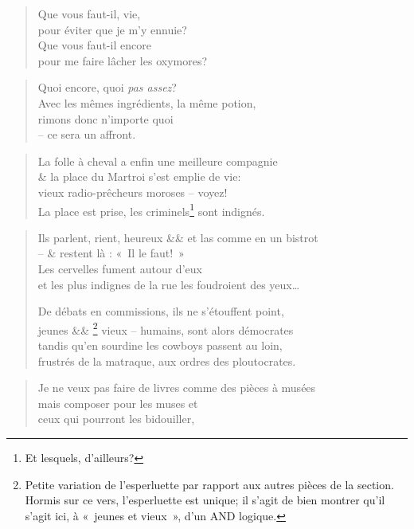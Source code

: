   \begin{verse}
    Que vous faut-il, vie,\\
    pour éviter que je m’y ennuie?\\
    Que vous faut-il encore\\
    pour me faire lâcher les oxymores?
  \end{verse}
  \begin{verse}
    Quoi encore, quoi \emph{pas assez}?\\
    Avec les mêmes ingrédients, la même potion,\\
    rimons donc n’importe quoi\\
    -- ce sera un affront.
  \end{verse}
  \begin{verse}
    La folle à cheval a enfin une meilleure compagnie\\
    \& la place du Martroi s’est emplie de vie:\\
    vieux radio-prêcheurs moroses -- voyez!\\
    La place est prise, les criminels\footnote{Et lesquels, d’ailleurs?} sont indignés.
  \end{verse}
  \begin{verse}
  Ils parlent, rient, heureux \&\& et las comme en un bistrot \\
  -- \& restent là : «~Il le faut!~»\\
  Les cervelles fument autour d’eux\\
  et les plus indignes de la rue les foudroient des yeux…

  De débats en commissions, ils ne s’étouffent point,\\
  jeunes \&\&
  \footnote{
    Petite variation de l’esperluette par rapport aux autres pièces de la section.
    Hormis sur ce vers, l’esperluette est unique; il s’agit de bien montrer qu’il
    s’agit ici, à «~jeunes et vieux~», d’un AND logique.
    }
   vieux -- humains, sont alors démocrates\\
   tandis qu’en sourdine les cowboys passent au loin,\\
   frustrés de la matraque, aux ordres des ploutocrates. 
  \end{verse}
  \begin{verse}
    Je ne veux pas faire de livres comme des pièces à musées\\
    mais composer pour les muses et\\
    ceux qui pourront les bidouiller,
  \end{verse}
